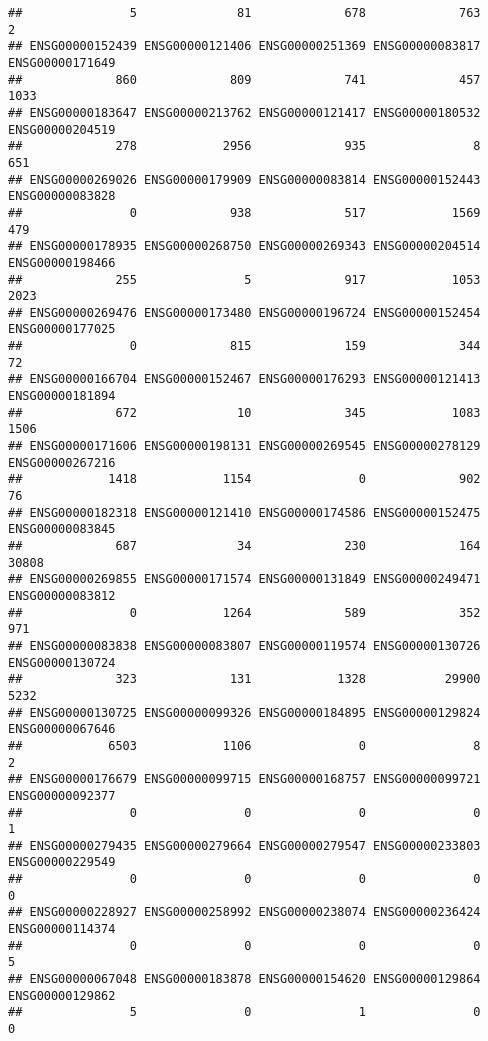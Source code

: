 \documentclass[
]{article}
\begin{document}
\begin{verbatim}
##               5              81             678             763               2 
## ENSG00000152439 ENSG00000121406 ENSG00000251369 ENSG00000083817 ENSG00000171649 
##             860             809             741             457            1033 
## ENSG00000183647 ENSG00000213762 ENSG00000121417 ENSG00000180532 ENSG00000204519 
##             278            2956             935               8             651 
## ENSG00000269026 ENSG00000179909 ENSG00000083814 ENSG00000152443 ENSG00000083828 
##               0             938             517            1569             479 
## ENSG00000178935 ENSG00000268750 ENSG00000269343 ENSG00000204514 ENSG00000198466 
##             255               5             917            1053            2023 
## ENSG00000269476 ENSG00000173480 ENSG00000196724 ENSG00000152454 ENSG00000177025 
##               0             815             159             344              72 
## ENSG00000166704 ENSG00000152467 ENSG00000176293 ENSG00000121413 ENSG00000181894 
##             672              10             345            1083            1506 
## ENSG00000171606 ENSG00000198131 ENSG00000269545 ENSG00000278129 ENSG00000267216 
##            1418            1154               0             902              76 
## ENSG00000182318 ENSG00000121410 ENSG00000174586 ENSG00000152475 ENSG00000083845 
##             687              34             230             164           30808 
## ENSG00000269855 ENSG00000171574 ENSG00000131849 ENSG00000249471 ENSG00000083812 
##               0            1264             589             352             971 
## ENSG00000083838 ENSG00000083807 ENSG00000119574 ENSG00000130726 ENSG00000130724 
##             323             131            1328           29900            5232 
## ENSG00000130725 ENSG00000099326 ENSG00000184895 ENSG00000129824 ENSG00000067646 
##            6503            1106               0               8               2 
## ENSG00000176679 ENSG00000099715 ENSG00000168757 ENSG00000099721 ENSG00000092377 
##               0               0               0               0               1 
## ENSG00000279435 ENSG00000279664 ENSG00000279547 ENSG00000233803 ENSG00000229549 
##               0               0               0               0               0 
## ENSG00000228927 ENSG00000258992 ENSG00000238074 ENSG00000236424 ENSG00000114374 
##               0               0               0               0               5 
## ENSG00000067048 ENSG00000183878 ENSG00000154620 ENSG00000129864 ENSG00000129862 
##               5               0               1               0               0 

\end{verbatim}
\end{document}
